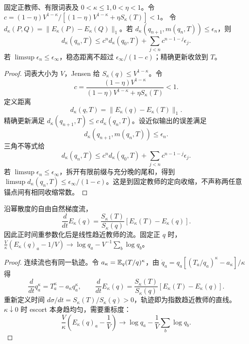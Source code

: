 \begin{theorem}
固定正教师、有限词表及 $0<\kappa\le1,0<\eta<1$。令
$c=(1-\eta)V^{1-\kappa}/[(1-\eta)V^{1-\kappa}+\eta S_\kappa(T)]<1$。
令 $d_\kappa(P,Q)=\|E_\kappa(P)-E_\kappa(Q)\|_1$。若 $d_\kappa(q_{n+1},m(q_n,T))\le\epsilon_n$，则
\begin{equation}
d_\kappa(q_n,T)\le c^nd_\kappa(q_0,T)+\sum_{j<n}c^{n-1-j}\epsilon_j.
\end{equation}
若 $\limsup\epsilon_n\le\epsilon_\infty$，稳态距离不超过 $\epsilon_\infty/(1-c)$；精确更新收敛到 $T$。
\end{theorem}
\begin{proof}
词表大小为 $V$，Jensen 给 $S_\kappa(q)\le V^{1-\kappa}$。令
\begin{equation}
c=\frac{(1-\eta)V^{1-\kappa}}
{(1-\eta)V^{1-\kappa}+\eta S_\kappa(T)}<1.
\end{equation}
定义距离
\begin{equation}
d_\kappa(q,T)=\|E_\kappa(q)-E_\kappa(T)\|_1.
\end{equation}
精确更新满足 $d_\kappa(q_{n+1},T)\le c\,d_\kappa(q_n,T)$。设近似输出的误差满足
\begin{equation}
d_\kappa(q_{n+1},m(q_n,T))\le\epsilon_n.
\end{equation}
三角不等式给
\begin{equation}
d_\kappa(q_n,T)\le c^nd_\kappa(q_0,T)+\sum_{j<n}c^{n-1-j}\epsilon_j.
\label{eq:escort-errors}
\end{equation}
若 $\limsup\epsilon_n\le\epsilon_\infty$，拆开有限前缀与充分晚的尾和，得到 $\limsup d_\kappa(q_n,T)\le\epsilon_\infty/(1-c)$。这是到固定教师的定向收缩，不声称两任意锚点间有相同收缩常数。
\end{proof}

\begin{proposition}
沿幂散度的自由自然梯度流，
\begin{equation}
\frac d{dt}E_\kappa(q)=\frac{S_\kappa(T)}{S_\kappa(q)}[E_\kappa(T)-E_\kappa(q)].
\end{equation}
因此正时间重参数化后是线性趋近教师的流。固定正 $q$ 时，
$\frac V\kappa(E_\kappa(q)_a-1/V)\to\log q_a-V^{-1}\sum_b\log q_b$。
\end{proposition}
\begin{proof}
连续流也有同一轨迹。令 $a_\kappa=\mathbb E_q(T/q)^\kappa$，由 $\dot q_a=q_a[(T_a/q_a)^\kappa-a_\kappa]/\kappa$ 得
\begin{equation}
\frac d{dt}q_a^\kappa=T_a^\kappa-a_\kappa q_a^\kappa,\qquad
\frac d{dt}E_\kappa(q)=\frac{S_\kappa(T)}{S_\kappa(q)}
[E_\kappa(T)-E_\kappa(q)].
\end{equation}
重新定义时间 $d\sigma/dt=S_\kappa(T)/S_\kappa(q)>0$，轨迹即为指数趋近教师的直线。$\kappa\downarrow0$ 时 escort 本身趋均匀，需要重标度：
\begin{equation}
\frac V\kappa\left(E_\kappa(q)_a-\frac1V\right)
\longrightarrow\log q_a-\frac1V\sum_b\log q_b.
\end{equation}
\end{proof}

